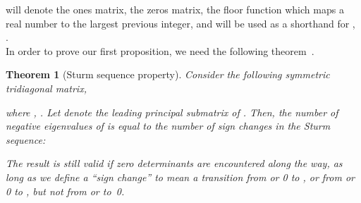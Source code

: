 \documentclass[letterpaper,9pt,twocolumn]{autart}
\newtheorem{theorem}{\textbf{Theorem}} \newtheorem{proposition}{\textbf{Proposition}} \newtheorem{corollary}{\textbf{Corollary}}
\begin{document}
 will denote the  ones matrix, 
 the  zeros matrix, 
 the floor function which maps a real number to the largest previous integer,
and  will be used as a shorthand for 
, .\\
\indent In order to prove our first proposition, we need the following theorem~\cite[Th.~8.5.1]{GolubLo_book96}.
\begin{theorem}[Sturm sequence property]\label{Theo_Sturm}
Consider the following  symmetric tridiagonal matrix,

where , . Let  denote the leading  principal submatrix of .
Then, the number of negative eigenvalues of 
is equal to the number of sign changes in the \emph{Sturm sequence}:

The result is still valid if zero determinants are encountered
along the way, as long as we define a ``sign change'' to mean a transition from  or 0 to ,
or from  or 0 to , but not from  or  to~0.~\hfill
\end{theorem}
\end{document}
